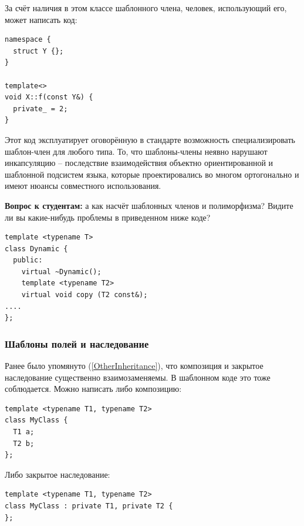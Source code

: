 \documentclass[a4paper,12pt,oneside]{article}
\newif\ifanswers
\begin{document}
За счёт наличия в этом классе шаблонного члена, человек, использующий его, может написать код:

\begin{lstlisting}
namespace {
  struct Y {};
}

template<>
void X::f(const Y&) {
  private_ = 2;
}
\end{lstlisting}

Этот код эксплуатирует оговорённую в стандарте возможность специализировать шаблон-член для любого типа. То, что шаблоны-члены неявно нарушают инкапсуляцию -- последствие взаимодействия объектно ориентированной и шаблонной подсистем языка, которые проектировались во многом ортогонально и имеют нюансы совместного использования.

\textbf{Вопрос к студентам:} а как насчёт шаблонных членов и полиморфизма? Видите ли вы какие-нибудь проблемы в приведенном ниже коде?

\begin{lstlisting}
template <typename T> 
class Dynamic { 
  public: 
    virtual ~Dynamic();
    template <typename T2> 
    virtual void copy (T2 const&); 
....
};
\end{lstlisting}

\ifanswers
Правильный ответ: да, проблемы есть. Обычный механизм виртуальных функций полагается на виртуальные таблицы фиксированного размера, однако количество актуальных экземпляров шаблонного метода может быть любым. Поэтому такие трюки в языке запрещены.
\fi

\subsubsection{Шаблоны полей и наследование}\label{TemplPrivate}

Ранее было упомянуто (\ref{OtherInheritance}), что композиция и закрытое наследование существенно взаимозаменяемы. В шаблонном коде это тоже соблюдается. Можно написать либо композицию:

\begin{lstlisting}
template <typename T1, typename T2> 
class MyClass { 
  T1 a; 
  T2 b; 
}; 
\end{lstlisting}

Либо закрытое наследование:

\begin{lstlisting}
template <typename T1, typename T2> 
class MyClass : private T1, private T2 { 
}; 
\end{lstlisting}
\end{document}
